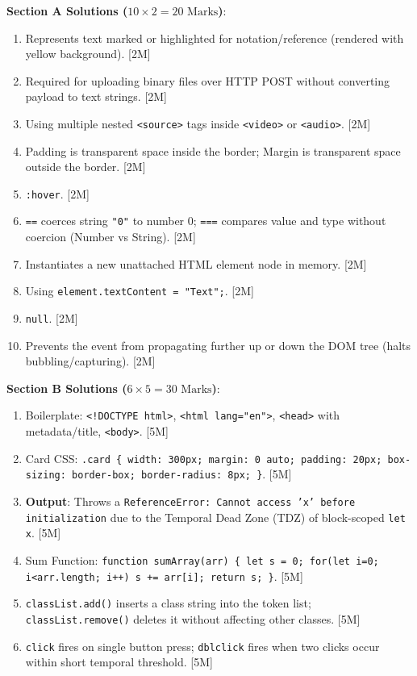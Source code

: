 \begin{solutionbox}
\noindent\textbf{Section A Solutions ($10 \times 2 = 20\text{ Marks}$)}:
\begin{enumerate}
    \item Represents text marked or highlighted for notation/reference (rendered with yellow background). [2M]
    \item Required for uploading binary files over HTTP POST without converting payload to text strings. [2M]
    \item Using multiple nested \texttt{<source>} tags inside \texttt{<video>} or \texttt{<audio>}. [2M]
    \item Padding is transparent space inside the border; Margin is transparent space outside the border. [2M]
    \item \texttt{:hover}. [2M]
    \item \texttt{==} coerces string \texttt{"0"} to number 0; \texttt{===} compares value and type without coercion (Number vs String). [2M]
    \item Instantiates a new unattached HTML element node in memory. [2M]
    \item Using \texttt{element.textContent = "Text";}. [2M]
    \item \texttt{null}. [2M]
    \item Prevents the event from propagating further up or down the DOM tree (halts bubbling/capturing). [2M]
\end{enumerate}

\medskip
\noindent\textbf{Section B Solutions ($6 \times 5 = 30\text{ Marks}$)}:
\begin{enumerate}[start=11]
    \item Boilerplate: \texttt{<!DOCTYPE html>}, \texttt{<html lang="en">}, \texttt{<head>} with metadata/title, \texttt{<body>}. [5M]
    \item Card CSS: \texttt{.card \{ width: 300px; margin: 0 auto; padding: 20px; box-sizing: border-box; border-radius: 8px; \}}. [5M]
    \item \textbf{Output}: Throws a \texttt{ReferenceError: Cannot access 'x' before initialization} due to the Temporal Dead Zone (TDZ) of block-scoped \texttt{let x}. [5M]
    \item Sum Function: \texttt{function sumArray(arr) \{ let s = 0; for(let i=0; i<arr.length; i++) s += arr[i]; return s; \}}. [5M]
    \item \texttt{classList.add()} inserts a class string into the token list; \texttt{classList.remove()} deletes it without affecting other classes. [5M]
    \item \texttt{click} fires on single button press; \texttt{dblclick} fires when two clicks occur within short temporal threshold. [5M]
\end{enumerate}


\end{solutionbox}
